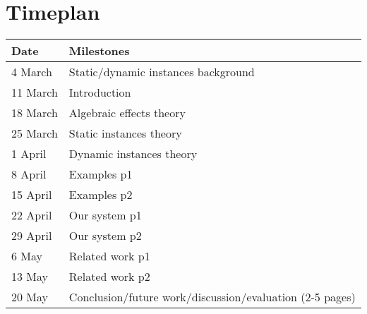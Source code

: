 \documentclass[12pt]{article}
\begin{document}
\section{Timeplan}
\begin{tabular}{ l | l }
\textbf{Date}             & \textbf{Milestones}						\\ \hline
4 March 	& Static/dynamic instances background						\\ \hline
11 March 	& Introduction																	\\ \hline
18 March 	& Algebraic effects theory											\\ \hline
25 March 	& Static instances theory      									\\ \hline
1 April 	& Dynamic instances theory											\\ \hline
8 April 	& Examples p1																		\\ \hline
15 April 	& Examples p2																		\\ \hline
22 April 	& Our system p1																	\\ \hline
29 April 	& Our system p2																	\\ \hline
6 May			&	Related work p1																\\ \hline
13 May		&	Related work p2																\\ \hline
20 May		& Conclusion/future work/discussion/evaluation (2-5 pages)	\\ \hline
\end{tabular}
\end{document}
